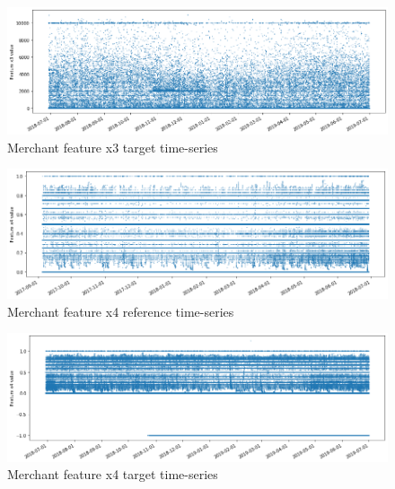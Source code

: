 \begin{figure}[!htb]
    \begin{center}
      \includegraphics[scale=0.5]{figures/merchant-x3-target.png}
      \caption{Merchant feature x3 target time-series}
      \label{fig:merchant-x3-target}
    \end{center}
\end{figure}

\begin{figure}[!htb]
    \begin{center}
      \includegraphics[scale=0.5]{figures/merchant-x4-reference.png}
      \caption{Merchant feature x4 reference time-series}
      \label{fig:merchant-x4-reference}
    \end{center}
\end{figure}

\begin{figure}[!htb]
    \begin{center}
      \includegraphics[scale=0.5]{figures/merchant-x4-target.png}
      \caption{Merchant feature x4 target time-series}
      \label{fig:merchant-x4-target}
    \end{center}
\end{figure}


